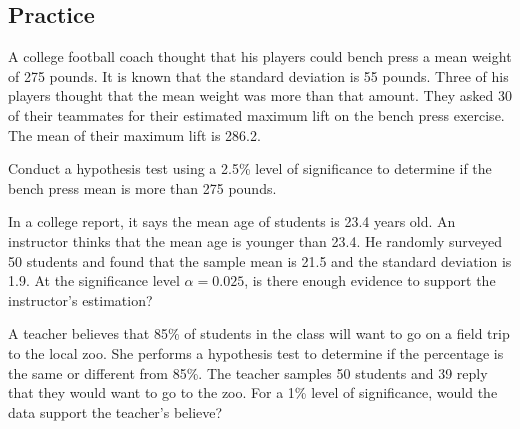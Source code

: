 \hypertarget{practice}{%
\subsection{Practice}\label{practice}}

\begin{exercise}

A college football coach thought that his players could bench press a
mean weight of 275 pounds. It is known that the standard deviation is 55
pounds. Three of his players thought that the mean weight was more than
that amount. They asked 30 of their teammates for their estimated
maximum lift on the bench press exercise. The mean of their maximum lift
is 286.2.

Conduct a hypothesis test using a 2.5\% level of significance to
determine if the bench press mean is more than 275 pounds.

\end{exercise}
\vspace*{8\baselineskip}

\begin{exercise}

In a college report, it says the mean age of students is 23.4 years old.
An instructor thinks that the mean age is younger than 23.4. He randomly
surveyed 50 students and found that the sample mean is 21.5 and the
standard deviation is 1.9. At the significance level \(\alpha=0.025\),
is there enough evidence to support the instructor's estimation?

\end{exercise}
\vspace*{8\baselineskip}

\begin{exercise}

A teacher believes that 85\% of students in the class will want to go on
a field trip to the local zoo. She performs a hypothesis test to
determine if the percentage is the same or different from 85\%. The
teacher samples 50 students and 39 reply that they would want to go to
the zoo. For a 1\% level of significance, would the data support the
teacher's believe?

\end{exercise}
\vspace*{8\baselineskip}



